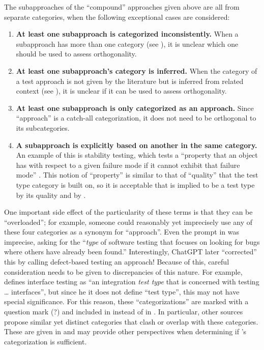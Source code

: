     The subapproaches of the ``compound'' approaches given above are all from
    separate categories, when the following exceptional cases are considered:
    \begin{enumerate}
        \item \textbf{At least one subapproach is categorized inconsistently.}
              When a subapproach has more than one category (see ),
              it is unclear which one should be used to assess orthogonality.
        \item \textbf{At least one subapproach's category is inferred.} When the category
              of a test approach is not given by the literature but is inferred
              from related context (see ), it is unclear if it can
              be used to assess orthogonality.
        \item \textbf{At least one subapproach is only categorized as an approach.}
              Since ``approach'' is a catch-all categorization, it does not
              need to be orthogonal to its subcategories.
        \item \textbf{A subapproach is explicitly based on another in the same
                  category.} An example of this is stability testing, which
              tests a ``property that an object has with respect to a given
              failure mode if it cannot exhibit that failure mode''
              \citep[p.~434]{IEEE2017}. This notion of
              ``property'' is similar to that of ``quality'' that the test type
              category is built on, so it is acceptable that is implied to be
              a test type by its quality \citep[p.~434]{IEEE2017}%
               and by \citet[p.~55]{Firesmith2015}.
    \end{enumerate}
\fi

One important side effect of the particularity of these terms is that they can
be ``overloaded''; for example, someone could reasonably yet imprecisely use
any of these four categories as a synonym for ``approach''. Even the prompt in
\ifnotpaper \citep[emphasis added]{ChatGPT2024} \else \cite{ChatGPT2024} \fi was
imprecise, asking for the ``\emph{type} of software testing that focuses on
looking for bugs where others have already been found.'' Interestingly, ChatGPT
later ``corrected'' this by calling defect-based testing an approach!
Because of this, careful consideration needs to be given to discrepancies of
this nature. For example, \citet[p.~45\ifnotpaper, emphasis added\fi]{Kam2008}
defines interface testing as ``an integration \emph{test type} that is
concerned with testing \dots{} interfaces'', but since \ifnotpaper he \else it
\fi does not define ``test type'', this may not have special significance.
\ifnotpaper For this reason, these ``categorizations'' are marked with a
    question mark (?) and included in  instead of in
    . In particular, other sources
    \citep[such as][]{SWEBOK2024,BarbosaEtAl2006} propose similar yet distinct
    categories that clash or overlap with these categories. These are given in
     and may provide other perspectives when determining
    if \citep{IEEE2022}'s categorization is sufficient.

